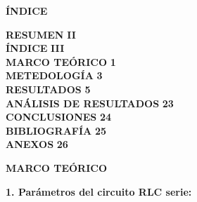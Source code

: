 \documentclass[12pt]{article}
\begin{document}
    \newpage
    
    \begin{center}
        \textbf{\large ÍNDICE}\\
    \end{center}
    
    \noindent \textbf{RESUMEN} \hfill \textbf{II}\\
    \noindent \textbf{ÍNDICE} \hfill \textbf{III}\\
    \noindent \textbf{MARCO TEÓRICO} \hfill \textbf{1}\\
    \noindent \textbf{METEDOLOGÍA} \hfill \textbf{3}\\
    \noindent \textbf{RESULTADOS} \hfill \textbf{5}\\
    \noindent \textbf{ANÁLISIS DE RESULTADOS} \hfill \textbf{23}\\
    \noindent \textbf{CONCLUSIONES} \hfill \textbf{24}\\
    \noindent \textbf{BIBLIOGRAFÍA} \hfill \textbf{25}\\
    \noindent \textbf{ANEXOS} \hfill \textbf{26}\\
    
    \newpage
    
    
    \begin{center}
        \textbf{\large MARCO TEÓRICO}\\
    \end{center}

    \textbf{1. Parámetros del circuito RLC serie:}
\end{document}
